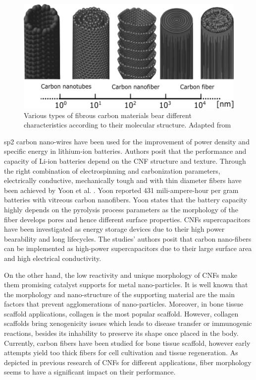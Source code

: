 \begin{figure}[th]
\centering
\includegraphics[scale=0.65]{./Figures/carbonFiberDiameterComparison.png}
\decoRule
\caption[Diameter comparison of various types of fibrous carbon materials]{Various types of fibrous carbon materials bear different characteristics according to their molecular structure. Adapted from \cite{Vajtai2013}}
\label{fig:diameterComparisonOfCarbonFibers}
\end{figure}

sp2 carbon nano-wires have been used for the improvement of power density and specific energy in lithium-ion batteries. \cite{Frackowiak2002, Endo2000, Winter1998} Authors posit that the performance and capacity of Li-ion batteries depend on the CNF structure and texture. Through the right combination of electrospinning and carbonization parameters, electrically conductive, mechanically tough and with thin diameter fibers have been achieved by Yoon et al. \cite{Yoon2004}. Yoon reported 431 mili-ampere-hour per gram batteries with vitreous carbon nanofibers. Yoon states that the battery capacity highly depends on the pyrolysis process parameters as the morphology of the fiber develops pores and hence different surface properties. CNFs supercapacitors have been investigated as energy storage devices due to their high power bearability and long lifecycles. \cite{Endo2001, Frackowiak2001, Pandolfo2006, Conway1999} The studies' authors posit that carbon nano-fibers can be implemented as high-power supercapacitors due to their large surface area and high electrical conductivity.

On the other hand, the low reactivity and unique morphology of CNFs make them promising catalyst supports for metal nano-particles. \cite{Choi2002, Li2002, Planeix1994} It is well known that the morphology and nano-structure of the supporting material are the main factors that prevent agglomerations of nano-particles. \cite{RomanMartinez1995, Serp2008} Moreover, in bone tissue scaffold applications, collagen is the most popular scaffold. However, collagen scaffolds bring xenogenicity issues which leads to disease transfer or immunogenic reactions, besides its inhability to preserve its shape once placed in the body. \cite{Bach1998, Butler1998, Delustro1990, Chachques2008, Atala2006, Glowacki2008, Valarmathi2008, Faraj2007} Currently, carbon fibers have been studied for bone tissue scaffold, however early attempts yield too thick fibers for cell cultivation and tissue regeneration. \cite{Visuri1991, Parsons1989} As depicted in previous research of CNFs for different applications, fiber morphology seems to have a significant impact on their performance. 

